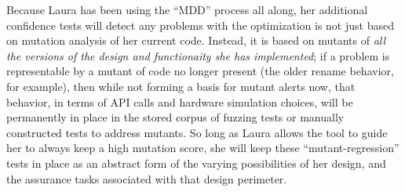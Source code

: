 Because Laura has been using the ``MDD'' process all along, her additional confidence tests will detect any problems with the optimization is not just based on mutation analysis of her current code.  Instead, it is based on mutants of \emph{all the versions of the design and functionaity she has implemented}; if a problem is representable by a mutant of code no longer present (the older rename behavior, for example), then while not forming a basis for mutant alerts now, that behavior, in terms of API calls and hardware simulation choices, will be permanently in place in the stored corpus of fuzzing tests or manually constructed tests to address mutants.  So long as Laura allows the tool to guide her to always keep a high mutation score, she will keep these ``mutant-regression'' tests in place as an abstract form of the varying possibilities of her design, and the assurance tasks associated with that design perimeter.